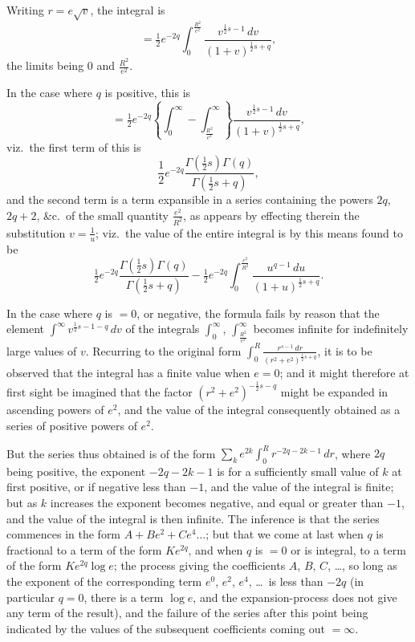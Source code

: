 \documentclass[11pt,a4paper]{book}
\begin{document}
\begin{art}\label{art:54}
Writing $r = e\sqrt{v}$, the integral is
\[
= \tfrac{1}{2}e^{-2q} \int_0^{\frac{R^2}{e^2}} \frac{v^{\frac{1}{2}s-1} \, dv}{(1+v)^{\frac{1}{2}s+q}},
\]
the limits being $0$ and $\frac{R^2}{e^2}$.

In the case where $q$ is positive, this is
\[
= \tfrac{1}{2}e^{-2q} \left\{ \int_0^\infty - \int_{\frac{R^2}{e^2}}^\infty \right\} \frac{v^{\frac{1}{2}s-1} \, dv}{(1+v)^{\frac{1}{2}s+q}},
\]
viz.\ the first term of this is
\[
\frac{1}{2}e^{-2q} \frac{\Gamma(\tfrac{1}{2}s)\Gamma(q)}{\Gamma(\tfrac{1}{2}s+q)},
\]
and the second term is a term expansible in a series containing the powers $2q$, $2q+2$, \&c.\ of the small quantity $\frac{e^2}{R^2}$, as appears by effecting therein the substitution $v = \frac{1}{u}$; viz.\ the value of the entire integral is by this means found to be
\[
\tfrac{1}{2}e^{-2q} \frac{\Gamma(\tfrac{1}{2}s)\Gamma(q)}{\Gamma(\tfrac{1}{2}s+q)} - \tfrac{1}{2}e^{-2q} \int_0^{\frac{e^2}{R^2}} \frac{u^{q-1} \, du}{(1+u)^{\frac{1}{2}s+q}}.
\]
\end{art}

\begin{art}\label{art:55}
In the case where $q$ is $=0$, or negative, the formula fails by reason that the element $\int^\infty v^{\frac{1}{2}s-1-q} \, dv$ of the integrals $\int_0^\infty$, $\int_{\frac{R^2}{e^2}}^\infty$ becomes infinite for indefinitely large values of $v$. Recurring to the original form $\int_0^R \frac{r^{s-1}\,dr}{(r^2+e^2)^{\frac{1}{2}s+q}}$, it is to be observed that the integral has a finite value when $e = 0$; and it might therefore at first sight be imagined that the factor $(r^2 + e^2)^{-\frac{1}{2}s-q}$ might be expanded in ascending powers of $e^2$, and the value of the integral consequently obtained as a series of positive powers of $e^2$.

But the series thus obtained is of the form $\sum_k e^{2k} \int_0^R r^{-2q-2k-1} \, dr$, where $2q$ being positive, the exponent $-2q-2k-1$ is for a sufficiently small value of $k$ at first positive, or if negative less than $-1$, and the value of the integral is finite; but as $k$ increases the exponent becomes negative, and equal or greater than $-1$, and the value of the integral is then infinite. The inference is that the series commences in the form $A + Be^2 + Ce^4 \ldots$; but that we come at last when $q$ is fractional to a term of the form $Ke^{2q}$, and when $q$ is $=0$ or is integral, to a term of the form $Ke^{2q}\log e$; the process giving the coefficients $A$, $B$, $C$, \ldots, so long as the exponent of the corresponding term $e^0$, $e^2$, $e^4$, \ldots\ is less than $-2q$ (in particular $q = 0$, there is a term $\log e$, and the expansion-process does not give any term of the result), and the failure of the series after this point being indicated by the values of the subsequent coefficients coming out $= \infty$.
\end{art}
\end{document}
